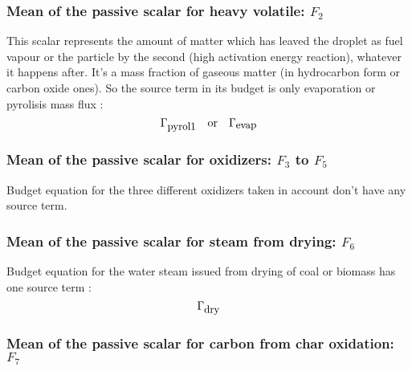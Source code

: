 \subsubsection*{Mean of the passive scalar for heavy volatile: $F_{2}$}  

This scalar represents the amount of matter which has leaved the droplet as fuel
vapour or the particle by the second (high activation energy reaction), whatever
it happens after. It's a mass fraction of gaseous matter (in hydrocarbon form or
carbon oxide ones). So the source term in its budget is only evaporation or
pyrolisis mass flux :
\begin{equation}
    \Gamma_{\mbox{\small pyrol1}} \quad \text{or} \quad \Gamma_{\mbox{\small evap}}
\end{equation}     

\subsubsection*{Mean of the passive scalar for oxidizers: $F_{3}$ to $F_{5}$}  

Budget equation for the three different oxidizers taken in account don't have
any source term.
\subsubsection*{Mean of the passive scalar for steam from drying: $F_{6}$}  
 
Budget equation for the water steam issued from drying of coal or biomass has
one source term :
\begin{equation}
    \Gamma_{\mbox{\small dry}} 
\end{equation} 

                                              
\subsubsection*{Mean of the passive scalar for carbon from char oxidation: $F_{7}$}  
  
